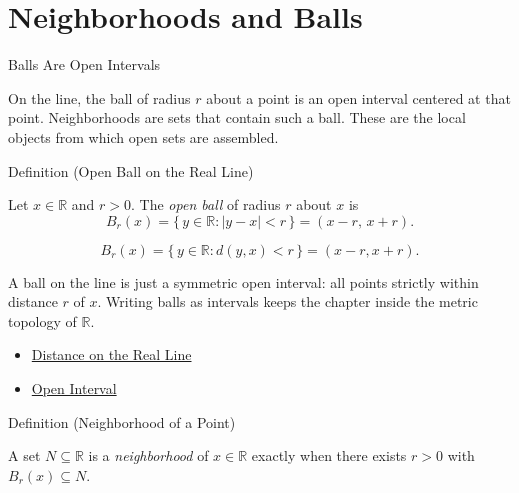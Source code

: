 \section{Neighborhoods and Balls}
\label{sec:neighborhoods-and-balls}

\begin{topicbox}{Balls Are Open Intervals}
\begin{exposition}
On the line, the ball of radius $r$ about a point is an open interval centered at that point. Neighborhoods are sets that contain such a ball. These are the local objects from which open sets are assembled.
\end{exposition}
\end{topicbox}
\begin{definitionbox}{Definition (Open Ball on the Real Line)}
\begin{definition}
\label{def:open-ball}
Let $x\in\mathbb{R}$ and $r>0$. The \emph{open ball} of radius $r$ about $x$ is
\[
B_{r}(x)=\{\,y\in\mathbb{R} : |y-x|<r\,\}=(x-r,\,x+r).
\]
\end{definition}
\end{definitionbox}
\begin{remark*}
\[
B_{r}(x)=\{\,y\in\mathbb{R} : d(y,x)<r\,\}=(x-r,x+r).
\]
\end{remark*}
\begin{remark*}[Interpretation]
A ball on the line is just a symmetric open interval: all points strictly within distance $r$ of $x$. Writing balls as intervals keeps the chapter inside the metric topology of $\mathbb{R}$.
\end{remark*}
\begin{dependencies}
\begin{itemize}
  \item \hyperref[def:distance-on-real-line]{Distance on the Real Line}
  \item \hyperref[def:open-interval]{Open Interval}
\end{itemize}
\end{dependencies}
\begin{definitionbox}{Definition (Neighborhood of a Point)}
\begin{definition}
\label{def:neighborhood}
A set $N\subseteq\mathbb{R}$ is a \emph{neighborhood} of $x\in\mathbb{R}$ exactly when there exists $r>0$ with $B_{r}(x)\subseteq N$.
\end{definition}
\end{definitionbox}
